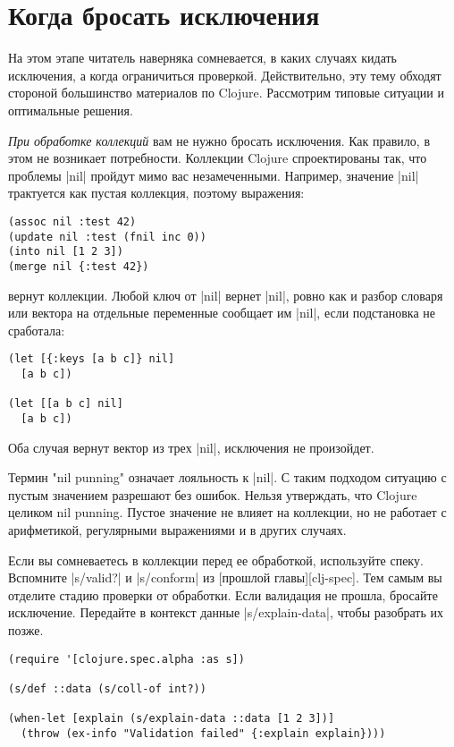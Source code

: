\section{Когда бросать исключения}

На этом этапе читатель наверняка сомневается, в каких случаях кидать исключения,
а когда ограничиться проверкой. Действительно, эту тему обходят стороной
большинство материалов по Clojure. Рассмотрим типовые ситуации и оптимальные
решения.

\emph{При обработке коллекций} вам не нужно бросать исключения. Как правило, в этом
не возникает потребности. Коллекции Clojure спроектированы так, что проблемы
\spverb|nil| пройдут мимо вас незамеченными. Например, значение \spverb|nil| трактуется как
пустая коллекция, поэтому выражения:

\begin{verbatim}
(assoc nil :test 42)
(update nil :test (fnil inc 0))
(into nil [1 2 3])
(merge nil {:test 42})
\end{verbatim}

вернут коллекции. Любой ключ от \spverb|nil| вернет \spverb|nil|, ровно как и разбор словаря
или вектора на отдельные переменные сообщает им \spverb|nil|, если подстановка не
сработала:

\begin{verbatim}
(let [{:keys [a b c]} nil]
  [a b c])

(let [[a b c] nil]
  [a b c])
\end{verbatim}

Оба случая вернут вектор из трех \spverb|nil|, исключения не произойдет.

Термин "nil punning" означает лояльность к \spverb|nil|. С таким подходом ситуацию с
пустым значением разрешают без ошибок. Нельзя утверждать, что Clojure целиком
nil punning. Пустое значение не влияет на коллекции, но не работает с
арифметикой, регулярными выражениями и в других случаях.

Если вы сомневаетесь в коллекции перед ее обработкой, используйте
спеку. Вспомните \spverb|s/valid?| и \spverb|s/conform| из [прошлой главы][clj-spec]. Тем
самым вы отделите стадию проверки от обработки. Если валидация не прошла,
бросайте исключение. Передайте в контекст данные \spverb|s/explain-data|, чтобы
разобрать их позже.

\begin{verbatim}
(require '[clojure.spec.alpha :as s])

(s/def ::data (s/coll-of int?))

(when-let [explain (s/explain-data ::data [1 2 3])]
  (throw (ex-info "Validation failed" {:explain explain})))
\end{verbatim}

